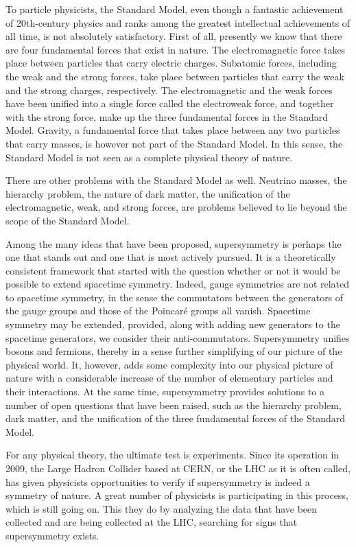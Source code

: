 To particle physicists, the Standard Model, even though a fantastic achievement
of 20th-century physics and ranks among the greatest intellectual achievements
of all time, is not absolutely satisfactory. First of all, presently we know
that there are four fundamental forces that exist in nature. The
electromagnetic force takes place between particles that carry electric
charges. Subatomic forces, including the weak and the strong forces, take place
between particles that carry the weak and the strong charges, respectively. The
electromagnetic and the weak forces have been unified into a single force
called the electroweak force, and together with the strong force, make up the
three fundamental forces in the Standard Model. Gravity, a fundamental force
that takes place between any two particles that carry masses, is however not
part of the Standard Model. In this sense, the Standard Model is not seen as a
complete physical theory of nature.

There are other problems with the Standard Model as well. Neutrino masses, the
hierarchy problem, the nature of dark matter, the unification of the
electromagnetic, weak, and strong forces, are problems believed to lie beyond
the scope of the Standard Model.

Among the many ideas that have been proposed, supersymmetry is perhaps the one
that stands out and one that is most actively pursued. It is a theoretically
consistent framework that started with the question whether or not it would be
possible to extend spacetime symmetry. Indeed, gauge symmetries are not related
to spacetime symmetry, in the sense the commutators between the generators of
the gauge groups and those of the Poincar\'{e} groups all vanish. Spacetime
symmetry may be extended, provided, along with adding new generators to the
spacetime generators, we consider their anti-commutators. Supersymmetry unifies
bosons and fermions, thereby in a sense further simplifying of our picture of
the physical world. It, however, adds some complexity into our physical picture
of nature with a considerable increase of the number of elementary particles
and their interactions. At the same time, supersymmetry provides solutions to a
number of open questions that have been raised, such as the hierarchy problem,
dark matter, and the unification of the three fundamental forces of the
Standard Model.


For any physical theory, the ultimate test is experiments. Since its operation
in 2009, the Large Hadron Collider based at CERN, or the LHC as it is often
called, has given physicists opportunities to verify if supersymmetry is indeed
a symmetry of nature. A great number of physicists is participating in this
process, which is still going on. This they do by analyzing the data that have
been collected and are being collected at the LHC, searching for signs that
supersymmetry exists.

